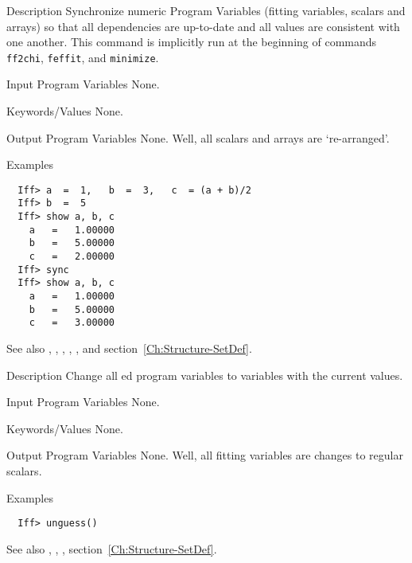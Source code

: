 \begin{IFFcom}
\item[Description] Synchronize numeric Program Variables (fitting
  variables, scalars and arrays) so that all dependencies are up-to-date
  and all values are consistent with one another.  This command is
  implicitly run at the beginning of commands {\texttt{ff2chi}},
  {\texttt{feffit}}, and {\texttt{minimize}}.
\item[Input Program Variables] None.
\item[Keywords/Values] None.
\item[Output Program Variables] None.  Well, all scalars and arrays are
  `re-arranged'.
\item[Examples] {\hspace{1.in} \vspace{-0.1truein} \relax }
\begin{verbatim} 
  Iff> a  =  1,   b  =  3,   c  = (a + b)/2
  Iff> b  =  5
  Iff> show a, b, c
    a   =   1.00000
    b   =   5.00000
    c   =   2.00000
  Iff> sync
  Iff> show a, b, c
    a   =   1.00000
    b   =   5.00000
    c   =   3.00000
\end{verbatim}
\item[See also] {}, {},
  {}, {}, {}, and
  section~{\ref{Ch:Structure-SetDef}}.
\end{IFFcom}


\begin{IFFcom}
\item[Description] Change all {}ed program variables to 
    {} variables with the current values.
\item[Input Program Variables] None.
\item[Keywords/Values] None.
\item[Output Program Variables] None.  Well, all fitting variables are
  changes to regular scalars.
\item[Examples] {\hspace{1.in} \vspace{-0.1truein} \relax }
\begin{verbatim} 
  Iff> unguess()
\end{verbatim}
\item[See also] {}, {},
  {}, section~{\ref{Ch:Structure-SetDef}}.
\end{IFFcom}


